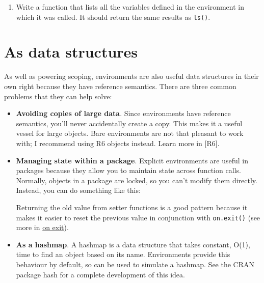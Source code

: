 \documentclass[]{book}
\newenvironment{Shaded}{\begin{snugshade}}{\end{snugshade}}
\newcommand{\ControlFlowTok}[1]{\textcolor[rgb]{0.13,0.29,0.53}{\textbf{#1}}}
\newcommand{\DataTypeTok}[1]{\textcolor[rgb]{0.13,0.29,0.53}{#1}}
\newcommand{\DecValTok}[1]{\textcolor[rgb]{0.00,0.00,0.81}{#1}}
\newcommand{\KeywordTok}[1]{\textcolor[rgb]{0.13,0.29,0.53}{\textbf{#1}}}
\newcommand{\NormalTok}[1]{#1}
\newcommand{\OperatorTok}[1]{\textcolor[rgb]{0.81,0.36,0.00}{\textbf{#1}}}
\newcommand{\StringTok}[1]{\textcolor[rgb]{0.31,0.60,0.02}{#1}}
\providecommand{\tightlist}{%
  \setlength{\itemsep}{0pt}\setlength{\parskip}{0pt}}
\theoremstyle{definition}
\theoremstyle{definition}
\theoremstyle{definition}
\theoremstyle{remark}
\begin{document}
\begin{enumerate}
\def\labelenumi{\arabic{enumi}.}
\tightlist
\item
  Write a function that lists all the variables defined in the
  environment in which it was called. It should return the same results
  as \texttt{ls()}.
\end{enumerate}

\hypertarget{explicit-envs}{%
\section{As data structures}\label{explicit-envs}}

As well as powering scoping, environments are also useful data
structures in their own right because they have reference semantics.
There are three common problems that they can help solve:

\begin{itemize}
\item
  \textbf{Avoiding copies of large data}. Since environments have
  reference semantics, you'll never accidentally create a copy. This
  makes it a useful vessel for large objects. Bare environments are not
  that pleasant to work with; I recommend using R6 objects instead.
  Learn more in {[}R6{]}.
\item
  \textbf{Managing state within a package}. Explicit environments are
  useful in packages because they allow you to maintain state across
  function calls. Normally, objects in a package are locked, so you
  can't modify them directly. Instead, you can do something like this:

\begin{Shaded}
\end{Shaded}

  Returning the old value from setter functions is a good pattern
  because it makes it easier to reset the previous value in conjunction
  with \texttt{on.exit()} (see more in \protect\hyperlink{on-exit}{on
  exit}).
\item
  \textbf{As a hashmap}. A hashmap is a data structure that takes
  constant, O(1), time to find an object based on its name. Environments
  provide this behaviour by default, so can be used to simulate a
  hashmap. See the CRAN package hash for a complete development of this
  idea.
\end{itemize}
\end{document}

